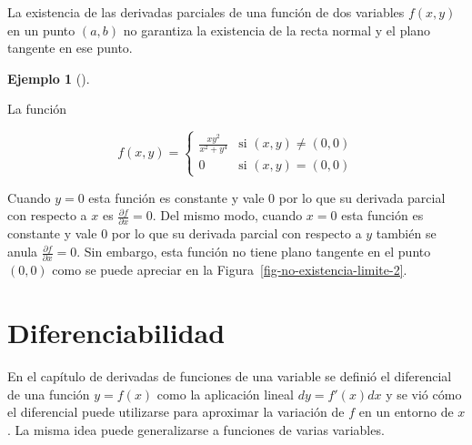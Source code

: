 \documentclass[
  a4paper,
]{scrreport}
\theoremstyle{definition}
\theoremstyle{plain}
\theoremstyle{plain}
\theoremstyle{definition}
\theoremstyle{definition}
\newtheorem{example}{Ejemplo}[chapter]
\theoremstyle{plain}
\theoremstyle{remark}
\begin{document}
\begin{tcolorbox}[enhanced jigsaw, breakable, title=\textcolor{quarto-callout-warning-color}{\faExclamationTriangle}\hspace{0.5em}{Advertencia}, toprule=.15mm, coltitle=black, arc=.35mm, rightrule=.15mm, colframe=quarto-callout-warning-color-frame, colbacktitle=quarto-callout-warning-color!10!white, toptitle=1mm, titlerule=0mm, leftrule=.75mm, opacityback=0, colback=white, bottomrule=.15mm, bottomtitle=1mm, left=2mm, opacitybacktitle=0.6]

La existencia de las derivadas parciales de una función de dos variables
\(f(x,y)\) en un punto \((a,b)\) no garantiza la existencia de la recta
normal y el plano tangente en ese punto.

\end{tcolorbox}

\begin{example}[]\protect\hypertarget{exm-funcion-sin-plano-tangente}{}\label{exm-funcion-sin-plano-tangente}

La función

\[
f(x,y) = 
\begin{cases}
\frac{xy^2}{x^2+y^4} & \mbox{si $(x,y)\neq (0,0)$}\\
0  & \mbox{si $(x,y) = (0,0)$}
\end{cases}
\]

Cuando \(y=0\) esta función es constante y vale \(0\) por lo que su
derivada parcial con respecto a \(x\) es
\(\frac{\partial f}{\partial x} = 0\). Del mismo modo, cuando \(x=0\)
esta función es constante y vale \(0\) por lo que su derivada parcial
con respecto a \(y\) también se anula
\(\frac{\partial f}{\partial x} = 0\). Sin embargo, esta función no
tiene plano tangente en el punto \((0,0)\) como se puede apreciar en la
Figura~\ref{fig-no-existencia-limite-2}.

\end{example}

\hypertarget{diferenciabilidad-1}{%
\section{Diferenciabilidad}\label{diferenciabilidad-1}}

En el capítulo de derivadas de funciones de una variable se definió el
diferencial de una función \(y=f(x)\) como la aplicación lineal
\(dy = f'(x)dx\) y se vió cómo el diferencial puede utilizarse para
aproximar la variación de \(f\) en un entorno de \(x\). La misma idea
puede generalizarse a funciones de varias variables.
\end{document}
